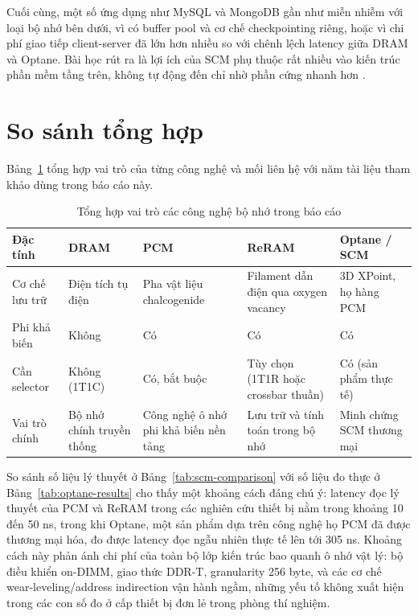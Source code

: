 \documentclass[12pt,a4paper]{article}
\begin{document}
Cuối cùng, một số ứng dụng như MySQL và MongoDB gần như miễn nhiễm với loại bộ nhớ bên dưới, vì có buffer pool và cơ chế checkpointing riêng, hoặc vì chi phí giao tiếp client-server đã lớn hơn nhiều so với chênh lệch latency giữa DRAM và Optane. Bài học rút ra là lợi ích của SCM phụ thuộc rất nhiều vào kiến trúc phần mềm tầng trên, không tự động đến chỉ nhờ phần cứng nhanh hơn \cite{izraelevitz2019}.

\section{So sánh tổng hợp}
\label{sec:summary}

Bảng~\ref{tab:final-comparison} tổng hợp vai trò của từng công nghệ và mối liên hệ với năm tài liệu tham khảo dùng trong báo cáo này.

\begin{table}[h]
\centering
\caption{Tổng hợp vai trò các công nghệ bộ nhớ trong báo cáo}
\label{tab:final-comparison}
\small
\begin{tabular}{p{2.4cm}p{2.6cm}p{2.6cm}p{2.6cm}p{3.4cm}}
\toprule
\textbf{Đặc tính} & \textbf{DRAM} & \textbf{PCM} & \textbf{ReRAM} & \textbf{Optane / SCM} \\
\midrule
Cơ chế lưu trữ & Điện tích tụ điện & Pha vật liệu chalcogenide & Filament dẫn điện qua oxygen vacancy & 3D XPoint, họ hàng PCM \\
Phi khả biến & Không & Có & Có & Có \\
Cần selector & Không (1T1C) & Có, bắt buộc & Tùy chọn (1T1R hoặc crossbar thuần) & Có (sản phẩm thực tế) \\
Vai trò chính & Bộ nhớ chính truyền thống & Công nghệ ô nhớ phi khả biến nền tảng & Lưu trữ và tính toán trong bộ nhớ & Minh chứng SCM thương mại \\
\bottomrule
\end{tabular}
\end{table}

So sánh số liệu lý thuyết ở Bảng~\ref{tab:scm-comparison} với số liệu đo thực ở Bảng~\ref{tab:optane-results} cho thấy một khoảng cách đáng chú ý: latency đọc lý thuyết của PCM và ReRAM trong các nghiên cứu thiết bị nằm trong khoảng 10 đến 50 ns, trong khi Optane, một sản phẩm dựa trên công nghệ họ PCM đã được thương mại hóa, đo được latency đọc ngẫu nhiên thực tế lên tới 305 ns. Khoảng cách này phản ánh chi phí của toàn bộ lớp kiến trúc bao quanh ô nhớ vật lý: bộ điều khiển on-DIMM, giao thức DDR-T, granularity 256 byte, và các cơ chế wear-leveling/address indirection vận hành ngầm, những yếu tố không xuất hiện trong các con số đo ở cấp thiết bị đơn lẻ trong phòng thí nghiệm.
\end{document}
